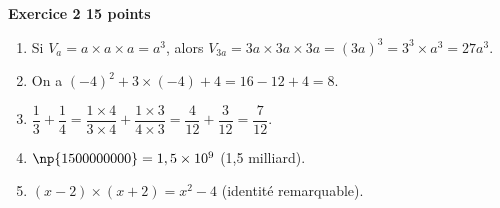 \documentclass[10pt]{article}
\begin{document}
\bigskip

\textbf{Exercice 2 \hfill 15 points}

\medskip

\begin{enumerate}
\item Si $V_a = a \times a \times a = a^3$, alors $V_{3a} =  3a \times 3a \times 3a = (3a)^3 = 3^3 \times a^3 = 27a^3$.
\item On a $(- 4)^2 + 3\times (- 4) + 4 = 16  - 12 + 4 = 8$.
\item $\dfrac{1}{3} + \dfrac{1}{4} = \dfrac{1\times 4}{3\times 4} + \dfrac{1\times 3}{4\times 3} = \dfrac{4}{12} + \dfrac{3}{12} = \dfrac{7}{12}$.
\item $\np{1500000000} = 1,5 \times 10^9$ (1,5 milliard).
\item $(x - 2)\times (x + 2) = x^2 - 4$ (identité remarquable).

\end{enumerate}

\bigskip
\end{document}
